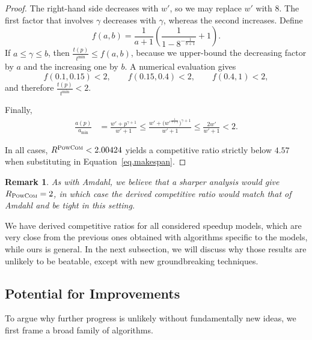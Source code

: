 \documentclass{article}
\newtheorem{remark}{Remark}
\newcommand\PCOM{\textsc{PowCom}\xspace}
\begin{document}
\begin{proof}
The right-hand side decreases with \(w'\), so we may replace \(w'\) with \(8\).  
The first factor that involves \(\gamma\) decreases with \(\gamma\), whereas the second increases.  
Define
\[
f(a,b)=\frac{1}{a+1}
        \left(
          \frac{1}{1-8^{-\frac{1}{b+1}}}+1
        \right).
\]
If \(a \le \gamma \le b\), then \(\tfrac{t(p)}{t^{\min}} \le f(a,b)\), because we upper-bound the decreasing factor by \(a\) and the increasing one by \(b\).  
A numerical evaluation gives
\[
f(0.1,0.15) < 2,\qquad
f(0.15,0.4) < 2,\qquad
f(0.4,1)   < 2,
\]
and therefore \(\frac{t(p)}{t^{\min}} < 2.\)

\medskip
\noindent
Finally,
\begin{align*}
\frac{a(p)}{a_{\min}}
   &= \frac{w'+p^{\gamma+1}}{w'+1} \le \frac{w'+\bigl(w'^{\frac{1}{\gamma+1}}\bigr)^{\gamma+1}}{w'+1}
   \le \frac{2w'}{w'+1} < 2 .
\end{align*}

\smallskip
\noindent
In all cases, \(R^{\PCOM}<2.00424\) yields a competitive ratio strictly below \(4.57\) when substituting in Equation~\ref{eq.makespan}.

\end{proof}

\begin{remark}
As with Amdahl, we believe that a sharper analysis would give
$R_{\PCOM}=2$, in which case the derived competitive ratio would match that
of Amdahl and be tight in this setting.
\end{remark}


We have derived competitive ratios for all considered speedup models, which are very close from the previous ones obtained with algorithms specific to the models, while ours is general. In the next subsection, we will discuss why those results are unlikely to be beatable, except with new groundbreaking techniques.

\subsection{Potential for Improvements}


To argue why further progress is unlikely without fundamentally new ideas, we first frame a broad family of algorithms.
\end{document}
